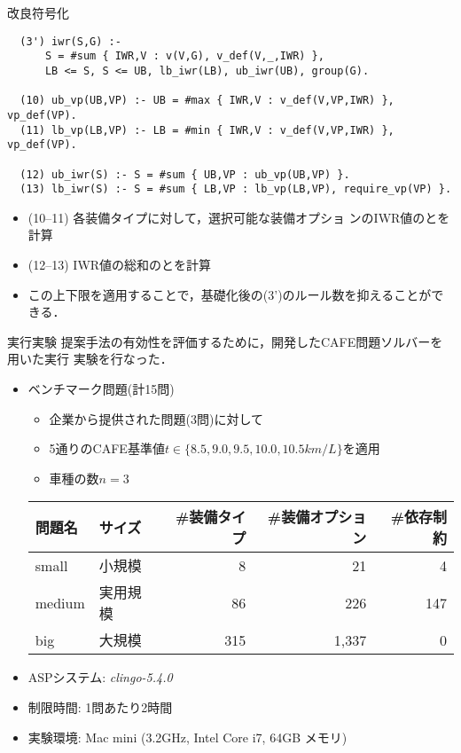 \documentclass[dvipdfmx, 11pt]{beamer}
\begin{document}
\begin{frame}[fragile]{改良符号化}
\begin{exampleblock}{}
\footnotesize
\begin{lstlisting}
  (3') iwr(S,G) :- 
      S = #sum { IWR,V : v(V,G), v_def(V,_,IWR) },
      LB <= S, S <= UB, lb_iwr(LB), ub_iwr(UB), group(G).

  (10) ub_vp(UB,VP) :- UB = #max { IWR,V : v_def(V,VP,IWR) }, vp_def(VP).
  (11) lb_vp(LB,VP) :- LB = #min { IWR,V : v_def(V,VP,IWR) }, vp_def(VP).

  (12) ub_iwr(S) :- S = #sum { UB,VP : ub_vp(UB,VP) }.
  (13) lb_iwr(S) :- S = #sum { LB,VP : lb_vp(LB,VP), require_vp(VP) }.
\end{lstlisting}
\end{exampleblock}
 \begin{itemize}
 \item (10--11) 各装備タイプに対して，選択可能な装備オプショ
   ンのIWR値のとを計算
 \item (12--13) IWR値の総和のとを計算
 \item この上下限を適用することで，基礎化後の(3')のルール数を抑えることができる．
 \end{itemize}
\end{frame}
\begin{frame}{実行実験}
提案手法の有効性を評価するために，開発したCAFE問題ソルバーを用いた実行
実験を行なった．
\vfill
\begin{itemize}
\item ベンチマーク問題(計15問)
  \begin{itemize}
  \item 企業から提供された問題(3問)に対して
  \item 5通りのCAFE基準値$t\in\{8.5, 9.0, 9.5, 10.0, 10.5km/L\}$を適用
  \item 車種の数$n = 3$
  \end{itemize}
  \begin{exampleblock}\small
    \centering
    \begin{tabular}{ ll|r r r }
      問題名 & サイズ &  \#装備タイプ & \#装備オプション& \#依存制約\\ \hline
      small	 & 小規模   &   8 &   21  &   4	\\
      medium & 実用規模 &  86 &  226  & 147	\\
      big    & 大規模   & 315 & 1,337 &   0
    \end{tabular}
  \end{exampleblock}
\item ASPシステム: \textit{clingo-5.4.0}
\item 制限時間: 1問あたり2時間
\item 実験環境: Mac mini (3.2GHz, Intel Core i7, 64GB メモリ)
\end{itemize}
\end{frame}
\end{document}
